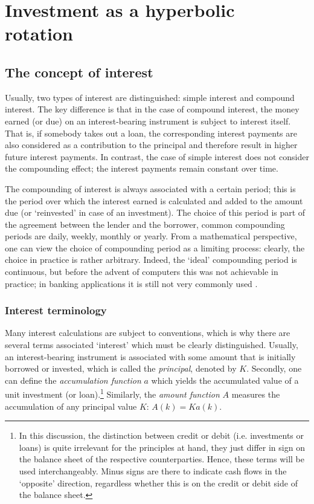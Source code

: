 \chapter{Investment as a hyperbolic rotation}
\label{chap:finance}

\section{The concept of interest}
Usually, two types of interest are distinguished: simple interest and compound interest. The key difference is that in the case of compound interest, the money earned (or due) on an interest-bearing instrument is subject to interest itself. That is, if somebody takes out a loan, the corresponding interest payments are also considered as a contribution to the principal and therefore result in higher future interest payments. In contrast, the case of simple interest does not consider the compounding effect; the interest payments remain constant over time. 

The compounding of interest is always associated with a certain period; this is the period over which the interest earned is calculated and added to the amount due (or `reinvested' in case of an investment). The choice of this period is part of the agreement between the lender and the borrower, common compounding periods are daily, weekly, monthly or yearly. From a mathematical perspective, one can view the choice of compounding period as a limiting process: clearly, the choice in practice is rather arbitrary. Indeed, the `ideal' compounding period is continuous, but before the advent of computers this was not achievable in practice; in banking applications it is still not very commonly used \cite{Zipf2003}.

\subsection{Interest terminology}
Many interest calculations are subject to conventions, which is why there are several terms associated `interest' which must be clearly distinguished. Usually, an interest-bearing instrument is associated with some amount that is initially borrowed or invested, which is called the \emph{principal}, denoted by \(K\). Secondly, one can define the \emph{accumulation function} \(a\) which yields the accumulated value of a unit investment (or loan).\footnote{In this discussion, the distinction between credit or debit (i.e. investments or loans) is quite irrelevant for the principles at hand, they just differ in sign on the balance sheet of the respective counterparties. Hence, these terms will be used interchangeably. Minus signs are there to indicate cash flows in the `opposite' direction, regardless whether this is on the credit or debit side of the balance sheet.}
Similarly, the \emph{amount function} \(A\) measures the accumulation of any principal value \(K\): \(A(k) = Ka(k)\). \cite{Kellison1991}

